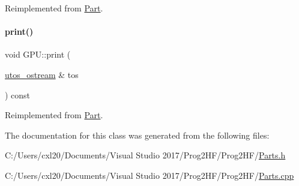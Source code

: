 Reimplemented from \mbox{\hyperlink{class_part_a4fa402b8e8fd4236ff773a7697ab2bc3}{Part}}.

\mbox{\label{class_g_p_u_acfa9ab35cdf1c25c324fc39c6ffc2412}} 
\paragraph{\texorpdfstring{print()}{print()}\hspace{0.1cm}{\footnotesize\ttfamily [2/2]}}
{\footnotesize\ttfamily void G\+P\+U\+::print (\begin{DoxyParamCaption}\item[{\mbox{\hyperlink{structutos__ostream}{utos\+\_\+ostream}} \&}]{tos }\end{DoxyParamCaption}) const\hspace{0.3cm}{\ttfamily [virtual]}}



Reimplemented from \mbox{\hyperlink{class_part_a9ecabe44ba3415badf82c6a23617a41e}{Part}}.



The documentation for this class was generated from the following files\+:\begin{DoxyCompactItemize}
\item 
C\+:/\+Users/cxl20/\+Documents/\+Visual Studio 2017/\+Prog2\+H\+F/\+Prog2\+H\+F/\mbox{\hyperlink{_parts_8h}{Parts.\+h}}\item 
C\+:/\+Users/cxl20/\+Documents/\+Visual Studio 2017/\+Prog2\+H\+F/\+Prog2\+H\+F/\mbox{\hyperlink{_parts_8cpp}{Parts.\+cpp}}\end{DoxyCompactItemize}
